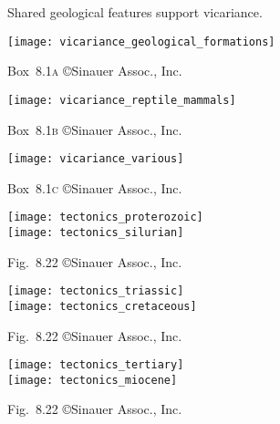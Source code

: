 \documentclass[t]{beamer}
\begin{document}
%
\begin{frame}[t]{Shared geological features support vicariance.}

	\vspace*{-0.5\baselineskip}
	
	\texttt{[image: vicariance\_geological\_formations]}
	
	\vfilll
	
	\hfill \tiny Box~8.1\textsc{a} \copyright Sinauer Assoc., Inc.
\end{frame}
%
\begin{frame}[t]

	{\centering
	\texttt{[image: vicariance\_reptile\_mammals]}\par
	}
	
	\vfilll
	
	\hfill \tiny Box~8.1\textsc{b} \copyright Sinauer Assoc., Inc.
\end{frame}
%
\begin{frame}[t]

	{\centering
	\texttt{[image: vicariance\_various]}\par
	}
	
	\vfilll
	
	\hfill \tiny Box~8.1\textsc{c} \copyright Sinauer Assoc., Inc.
\end{frame}
%
\begin{frame}[t]

	{\centering
	\texttt{[image: tectonics\_proterozoic]}\\[1ex]
	\texttt{[image: tectonics\_silurian]}\par
	}
	
	\vfilll
	
	\hfill \tiny Fig.~8.22 \copyright Sinauer Assoc., Inc.
\end{frame}
%
\begin{frame}[t]

	{\centering
	\texttt{[image: tectonics\_triassic]}\\[1ex]
	\texttt{[image: tectonics\_cretaceous]}\par
	}
	
	\vfilll
	
	\hfill \tiny Fig.~8.22 \copyright Sinauer Assoc., Inc.
\end{frame}
%
\begin{frame}[t]

	{\centering
	\texttt{[image: tectonics\_tertiary]}\\[1ex]
	\texttt{[image: tectonics\_miocene]}\par
	}
	
	\vfilll
	
	\hfill \tiny Fig.~8.22 \copyright Sinauer Assoc., Inc.
\end{frame}
\end{document}

